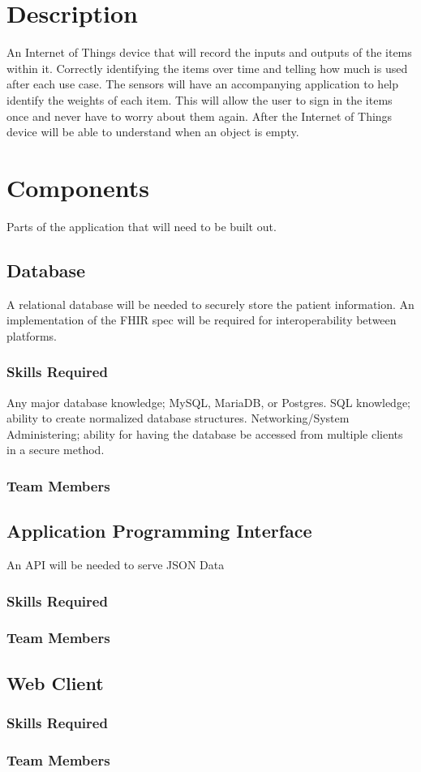 \documentclass{article}
\begin{document}


\section{Description}
An Internet of Things device that will record the inputs and outputs of the items within it. 
Correctly identifying the items over time and telling how much is used after each use case.
The sensors will have an accompanying application to help identify the weights of each item.
This will allow the user to sign in the items once and never have to worry about them again.
After the Internet of Things device will be able to understand when an object is empty.

\section{Components}
Parts of the application that will need to be built out.

\subsection{Database}
A relational database will be needed to securely store the patient information.
An implementation of the FHIR spec will be required for interoperability between platforms.
\subsubsection{Skills Required}
Any major database knowledge; MySQL, MariaDB, or Postgres.
SQL knowledge; ability to create normalized database structures.
Networking/System Administering; ability for having the database be accessed from multiple clients in a secure method.
\subsubsection{Team Members}

\subsection{Application Programming Interface}
An API will be needed to serve JSON Data
\subsubsection{Skills Required}
\subsubsection{Team Members}

\subsection{Web Client}
\subsubsection{Skills Required}
\subsubsection{Team Members}
\end{document}
